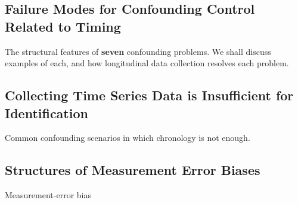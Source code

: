 \documentclass[
  single column]{article}
\begin{document}
\subsection{Failure Modes for Confounding Control Related to
Timing}\label{failure-modes-for-confounding-control-related-to-timing}

\begin{table}

\caption{\label{tbl-elementary-chronological-hyg}}

\centering{

\captionsetup{labelsep=none}

\terminologychronologicalhygeine

}

\end{table}%

The structural features of \textbf{seven} confounding problems. We shall
discuss examples of each, and how longitudinal data collection resolves
each problem.

\newpage{}

\subsection{Collecting Time Series Data is Insufficient for
Identification}\label{collecting-time-series-data-is-insufficient-for-identification}

\begin{table}

\caption{\label{tbl-chronology-notenough}Common confounding scenarios in
which chronology is not enough.}

\centering{

\terminologychronologicalhygeineNOTENOUGH

}

\end{table}%

\newpage{}

\subsection{Structures of Measurement Error
Biases}\label{structures-of-measurement-error-biases}

\begin{table}

\caption{\label{tbl-measurement-error}Measurement-error bias}

\centering{

\terminologymeasurementerror

}

\end{table}%
\end{document}
